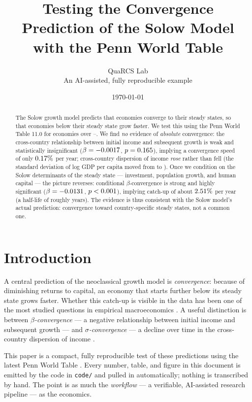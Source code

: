 \documentclass[11pt]{article}
\title{Testing the Convergence Prediction of the Solow Model\\
       with the Penn World Table}
\author{QuaRCS Lab \\ \small An AI-assisted, fully reproducible example}
\date{\today}
\begin{document}
\maketitle

\begin{abstract}
The Solow growth model predicts that economies converge to their steady states,
so that economies below their steady state grow faster. We test this using the
Penn World Table 11.0 for \Nabs{} economies over \startYear--\finalYear. We find
\emph{no} evidence of \emph{absolute} convergence: the cross-country relationship
between initial income and subsequent growth is weak and statistically
insignificant ($\beta = -0.0017$, $p = 0.165$), implying a convergence speed of
only $0.17\%$ per year; cross-country dispersion of income \emph{rose}
rather than fell (the standard deviation of log GDP per capita moved from
\sigmaStart{} to \sigmaEnd). Once we condition on the Solow determinants of the
steady state --- investment, population growth, and human capital --- the picture
reverses: conditional $\beta$-convergence is strong and highly significant
($\beta = -0.0131$, $p < 0.001$), implying catch-up of about $2.51\%$ per
year (a half-life of roughly \halflifeCond{} years). The evidence is thus
consistent with the Solow model's actual prediction: convergence toward
country-specific steady states, not a common one.
\end{abstract}

\section{Introduction}
\label{sec:intro}
A central prediction of the neoclassical growth model \citep{solow1956} is
\emph{convergence}: because of diminishing returns to capital, an economy that
starts further below its steady state grows faster. Whether this catch-up is
visible in the data has been one of the most studied questions in empirical
macroeconomics \citep{barro1991, barrosala1992, mrw1992}. A useful distinction is
between \emph{$\beta$-convergence} --- a negative relationship between initial
income and subsequent growth --- and \emph{$\sigma$-convergence} --- a decline
over time in the cross-country dispersion of income \citep{barrosala2004}.

This paper is a compact, fully reproducible test of these predictions using the
latest Penn World Table \citep{feenstra2015}. Every number, table, and figure in
this document is emitted by the code in \texttt{code/} and pulled in
automatically; nothing is transcribed by hand. The point is as much the
\emph{workflow} --- a verifiable, AI-assisted research pipeline --- as the
economics.
\end{document}
